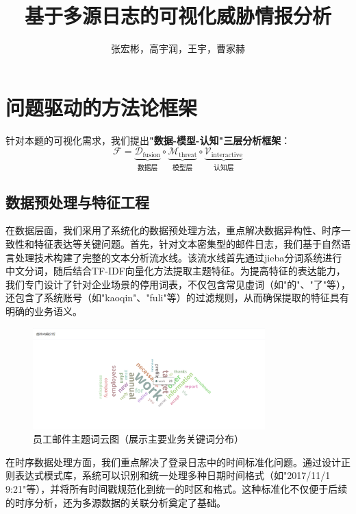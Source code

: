 \documentclass[UTF8,12pt]{ctexart}
\title{基于多源日志的可视化威胁情报分析}
\author{张宏彬，高宇润，王宇，曹家赫}
\begin{document}
\maketitle

\section{问题驱动的方法论框架}
针对本题的可视化需求，我们提出\textbf{"数据-模型-认知"三层分析框架}：
\begin{equation}
\mathcal{F} = \underbrace{\mathcal{D}_{\text{fusion}}}_{\text{数据层}} \circ \underbrace{\mathcal{M}_{\text{threat}}}_{\text{模型层}} \circ \underbrace{\mathcal{V}_{\text{interactive}}}_{\text{认知层}}
\end{equation}

\subsection{数据预处理与特征工程}
在数据层面，我们采用了系统化的数据预处理方法，重点解决数据异构性、时序一致性和特征表达等关键问题。首先，针对文本密集型的邮件日志，我们基于自然语言处理技术构建了完整的文本分析流水线。该流水线首先通过jieba分词系统进行中文分词，随后结合TF-IDF向量化方法提取主题特征。为提高特征的表达能力，我们专门设计了针对企业场景的停用词表，不仅包含常见虚词（如"的"、"了"等），还包含了系统账号（如"kaoqin"、"fuli"等）的过滤规则，从而确保提取的特征具有明确的业务语义。

\begin{figure}[H]
    \centering
    \includegraphics[width=0.8\textwidth]{person_wordcloud.png}
    \caption{员工邮件主题词云图（展示主要业务关键词分布）}
    \label{fig:person_wordcloud}
\end{figure}

在时序数据处理方面，我们重点解决了登录日志中的时间标准化问题。通过设计正则表达式模式库，系统可以识别和统一处理多种日期时间格式（如"2017/11/1 9:21"等），并将所有时间戳规范化到统一的时区和格式。这种标准化不仅便于后续的时序分析，还为多源数据的关联分析奠定了基础。
\end{document}
